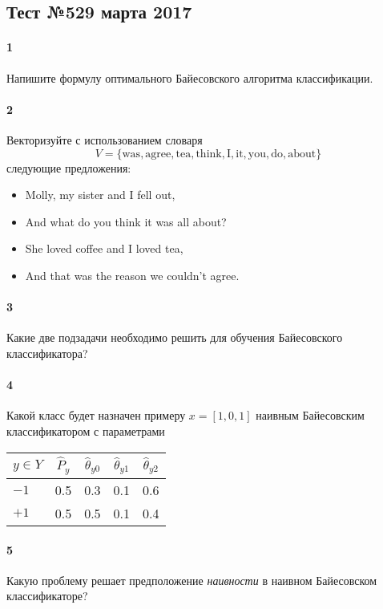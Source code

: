 \documentclass[a4paper,12pt]{article}
\begin{document}
  \subsection*{Тест №5\hfill{29 марта 2017}}

  \paragraph{1} Напишите формулу оптимального Байесовского алгоритма классификации.
  
  \makebox[\linewidth]{\hrulefill}
  \makebox[\linewidth]{\hrulefill}
  
  \paragraph{2} Векторизуйте с использованием словаря
  $$
  V = \{\text{was}, \text{agree}, \text{tea}, \text{think},
        \text{I}, \text{it}, \text{you}, \text{do}, \text{about}\}
  $$
  следующие предложения:
  \begin{itemize}
  \item Molly, my sister and I fell out,
  \item And what do you think it was all about?
  \item She loved coffee and I loved tea,
  \item And that was the reason we couldn't agree.
  \end{itemize}

  \paragraph{3} Какие две подзадачи необходимо решить для обучения Байесовского
  классификатора?

  \makebox[\linewidth]{\hrulefill}
  \makebox[\linewidth]{\hrulefill}
  \makebox[\linewidth]{\hrulefill}
  \makebox[\linewidth]{\hrulefill}

  \paragraph{4} Какой класс будет назначен примеру $x = [1, 0, 1]$
  наивным Байесовским классификатором с параметрами
  \begin{center}
    \begin{tabular}{l|c|ccc}
      $y \in Y$   & $\hat{P}_y$ & $\hat{\theta}_{y0}$ & $\hat{\theta}_{y1}$ & $\hat{\theta}_{y2}$ \\
      \hline
      ${-}1$      & 0.5    & 0.3      & 0.1     & 0.6   \\
      ${+}1$      & 0.5    & 0.5      & 0.1     & 0.4
    \end{tabular}
  \end{center}

  \vspace{4em}
  
  \paragraph{5} Какую проблему решает предположение \emph{наивности} в наивном
  Байесовском классификаторе?

  \makebox[\linewidth]{\hrulefill}
  \makebox[\linewidth]{\hrulefill}
  \makebox[\linewidth]{\hrulefill}
  \makebox[\linewidth]{\hrulefill}
  
\end{document}
